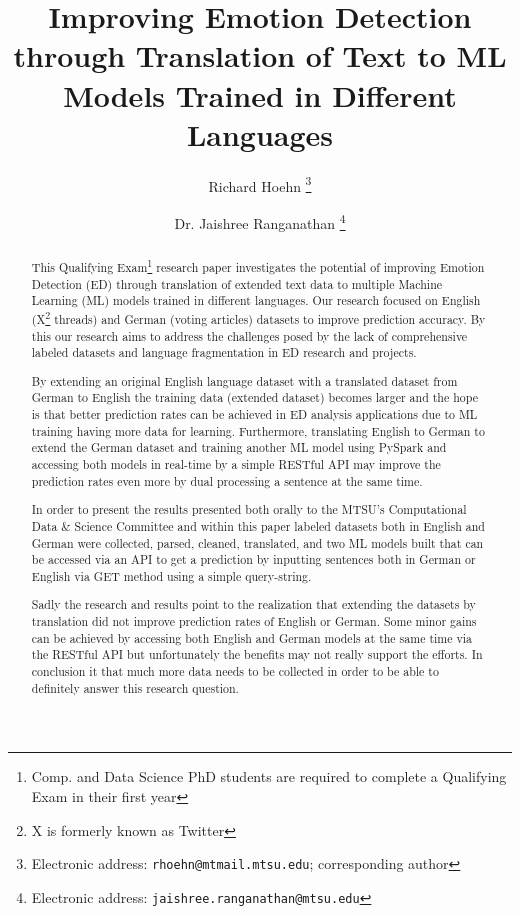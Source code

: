 \documentclass[11pt]{article}
\title{Improving Emotion Detection through Translation of Text to ML Models Trained in Different Languages}
\author{Richard Hoehn%
	\thanks{Electronic address: \texttt{rhoehn@mtmail.mtsu.edu}; corresponding author}}
\affil{Middle Tennessee State University}
\author{Dr. Jaishree Ranganathan%
	\thanks{Electronic address: \texttt{jaishree.ranganathan@mtsu.edu}}}
\affil{Middle Tennessee State University}
\begin{document}
\maketitle

\begin{abstract}
This Qualifying Exam\footnote{Comp. and Data Science PhD students are required to complete a Qualifying Exam in their first year} research paper investigates the potential of improving Emotion Detection (ED) through translation of extended text data to multiple Machine Learning (ML) models trained in different languages. Our research focused on  English (X\footnote{X is formerly known as Twitter} threads) and German (voting articles) datasets to improve prediction accuracy. By this our research aims to address the challenges posed by the lack of comprehensive labeled datasets and language fragmentation in ED research and projects.

By extending an original English language dataset with a translated dataset from German to English the training data (extended dataset) becomes larger and the hope is that better prediction rates can be achieved in ED analysis applications due to ML training having more data for learning. Furthermore, translating English to German to extend the German dataset and training another ML model using PySpark and accessing both models in real-time by a simple RESTful API may improve the prediction rates even more by dual processing a sentence at the same time.

In order to present the results presented both orally to the MTSU's Computational Data \& Science Committee and within this paper labeled datasets both in English and German were collected, parsed, cleaned, translated, and two ML models built that can be accessed via an API to get a prediction by inputting sentences both in German or English via GET method using a simple query-string.

Sadly the research and results point to the realization that extending the datasets by translation did not improve prediction rates of English or German. Some minor gains can be achieved by accessing both English and German models at the same time via the RESTful API but unfortunately the benefits may not really support the efforts. In conclusion it that much more data needs to be collected in order to be able to definitely answer this research question.
\end{abstract}
\clearpage

\tableofcontents
\end{document}
